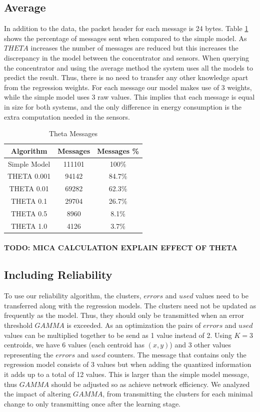 \documentclass{mproj}
\begin{document}
\subsection{Average}
In addition to the data, the packet header for each message is 24 bytes. Table \ref{table:thetaMessages} shows the percentage of messages sent when compared to the simple model. As $THETA$ increases the number of messages are reduced but this increases the discrepancy in the model between the concentrator and sensors. When querying the concentrator and using the average method the system uses all the models to predict the result. Thus, there is no need to transfer any other knowledge apart from the regression weights. For each message our model makes use of 3 weights, while the simple model uses 3 raw values. This implies that each message is equal in size for both systems, and the only difference in energy consumption is the extra computation needed in the sensors.

\begin{table}[!ht]
 \centering
 \begin{tabular}{||c | c | c||}
 \hline
 Algorithm & Messages & Messages \%\\
 \hline\hline
 Simple Model & 111101 & 100\%\\ 
 \hline
 THETA 0.001 & 94142 & 84.7\%\\
 \hline
 THETA 0.01 & 69282 & 62.3\%\\
 \hline
 THETA 0.1 & 29704 & 26.7\%\\
 \hline
 THETA 0.5 & 8960 & 8.1\%\\
 \hline
 THETA 1.0 & 4126 & 3.7\%\\
 \hline
\end{tabular}
\caption{Theta Messages}
 \label{table:thetaMessages} 
\end{table}

\paragraph{TODO: MICA CALCULATION EXPLAIN EFFECT OF THETA}

\subsection{Including Reliability}
To use our reliability algorithm, the clusters, $errors$ and $used$ values need to be transferred along with the regression models. The clusters need not be updated as frequently as the model. Thus, they should only be transmitted when an error threshold $GAMMA$ is exceeded. As an optimization the pairs of $errors$ and $used$ values can be multiplied together to be send as 1 value instead of 2. Using $K=3$ centroids, we have 6 values (each centroid has $(x,y)$) and 3 other values representing the $errors$ and $used$ counters. The message that contains only the regression model consists of 3 values but when adding the quantized information it adds up to a total of 12 values. This is larger than the simple model message, thus $GAMMA$ should be adjusted so as achieve network efficiency. We analyzed the impact of altering $GAMMA$, from transmitting the clusters for each minimal change to only transmitting once after the learning stage.
\end{document}
